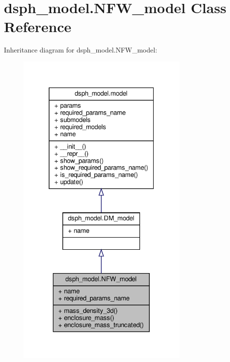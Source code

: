 \hypertarget{classdsph__model_1_1NFW__model}{}\section{dsph\+\_\+model.\+N\+F\+W\+\_\+model Class Reference}
\label{classdsph__model_1_1NFW__model}


Inheritance diagram for dsph\+\_\+model.\+N\+F\+W\+\_\+model\+:\nopagebreak
\begin{figure}[H]
\begin{center}
\leavevmode
\includegraphics[width=241pt]{d5/dc5/classdsph__model_1_1NFW__model__inherit__graph}
\end{center}
\end{figure}


